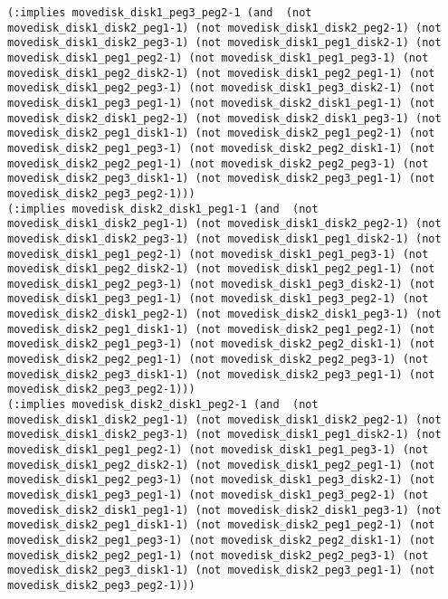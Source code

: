 \documentclass[12pt,letterpaper]{ntdhw}
\begin{document}
\begin{enumerate}
\begin{enumerate}
\begin{lstlisting}[language=pddl, style=pddlstyle,
  basicstyle=\scriptsize]
(:implies movedisk_disk1_peg3_peg2-1 (and  (not movedisk_disk1_disk2_peg1-1) (not movedisk_disk1_disk2_peg2-1) (not movedisk_disk1_disk2_peg3-1) (not movedisk_disk1_peg1_disk2-1) (not movedisk_disk1_peg1_peg2-1) (not movedisk_disk1_peg1_peg3-1) (not movedisk_disk1_peg2_disk2-1) (not movedisk_disk1_peg2_peg1-1) (not movedisk_disk1_peg2_peg3-1) (not movedisk_disk1_peg3_disk2-1) (not movedisk_disk1_peg3_peg1-1) (not movedisk_disk2_disk1_peg1-1) (not movedisk_disk2_disk1_peg2-1) (not movedisk_disk2_disk1_peg3-1) (not movedisk_disk2_peg1_disk1-1) (not movedisk_disk2_peg1_peg2-1) (not movedisk_disk2_peg1_peg3-1) (not movedisk_disk2_peg2_disk1-1) (not movedisk_disk2_peg2_peg1-1) (not movedisk_disk2_peg2_peg3-1) (not movedisk_disk2_peg3_disk1-1) (not movedisk_disk2_peg3_peg1-1) (not movedisk_disk2_peg3_peg2-1)))
(:implies movedisk_disk2_disk1_peg1-1 (and  (not movedisk_disk1_disk2_peg1-1) (not movedisk_disk1_disk2_peg2-1) (not movedisk_disk1_disk2_peg3-1) (not movedisk_disk1_peg1_disk2-1) (not movedisk_disk1_peg1_peg2-1) (not movedisk_disk1_peg1_peg3-1) (not movedisk_disk1_peg2_disk2-1) (not movedisk_disk1_peg2_peg1-1) (not movedisk_disk1_peg2_peg3-1) (not movedisk_disk1_peg3_disk2-1) (not movedisk_disk1_peg3_peg1-1) (not movedisk_disk1_peg3_peg2-1) (not movedisk_disk2_disk1_peg2-1) (not movedisk_disk2_disk1_peg3-1) (not movedisk_disk2_peg1_disk1-1) (not movedisk_disk2_peg1_peg2-1) (not movedisk_disk2_peg1_peg3-1) (not movedisk_disk2_peg2_disk1-1) (not movedisk_disk2_peg2_peg1-1) (not movedisk_disk2_peg2_peg3-1) (not movedisk_disk2_peg3_disk1-1) (not movedisk_disk2_peg3_peg1-1) (not movedisk_disk2_peg3_peg2-1)))
(:implies movedisk_disk2_disk1_peg2-1 (and  (not movedisk_disk1_disk2_peg1-1) (not movedisk_disk1_disk2_peg2-1) (not movedisk_disk1_disk2_peg3-1) (not movedisk_disk1_peg1_disk2-1) (not movedisk_disk1_peg1_peg2-1) (not movedisk_disk1_peg1_peg3-1) (not movedisk_disk1_peg2_disk2-1) (not movedisk_disk1_peg2_peg1-1) (not movedisk_disk1_peg2_peg3-1) (not movedisk_disk1_peg3_disk2-1) (not movedisk_disk1_peg3_peg1-1) (not movedisk_disk1_peg3_peg2-1) (not movedisk_disk2_disk1_peg1-1) (not movedisk_disk2_disk1_peg3-1) (not movedisk_disk2_peg1_disk1-1) (not movedisk_disk2_peg1_peg2-1) (not movedisk_disk2_peg1_peg3-1) (not movedisk_disk2_peg2_disk1-1) (not movedisk_disk2_peg2_peg1-1) (not movedisk_disk2_peg2_peg3-1) (not movedisk_disk2_peg3_disk1-1) (not movedisk_disk2_peg3_peg1-1) (not movedisk_disk2_peg3_peg2-1)))

\end{lstlisting}
\end{enumerate}
\end{enumerate}
\end{document}
